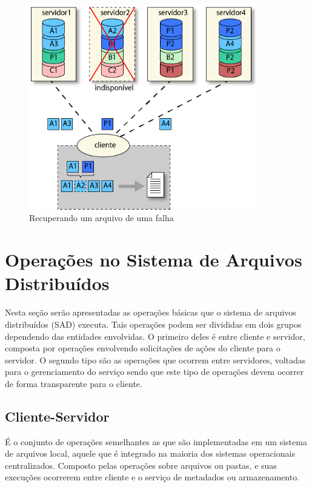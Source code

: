 \begin{figure}[htb]
	\begin{center}
		
		\includegraphics[clip,width=10.0cm]{images/image2.png}
		\caption{Recuperando um arquivo de uma falha}
		\label{fig:img2}
	\end{center}
\end{figure}

\section{Operações no Sistema de Arquivos Distribuídos}

Nesta seção serão apresentadas as operações básicas que o sistema de arquivos distribuídos (SAD) executa. Tais operações podem ser divididas em dois grupos dependendo das entidades envolvidas. O primeiro deles é entre cliente e servidor, composta por operações envolvendo solicitações de ações do cliente para o servidor. O segundo tipo são as operações que ocorrem entre servidores, voltadas para o gerenciamento do serviço sendo que este tipo de operações devem ocorrer de forma transparente para o cliente.
\\

\subsection{Cliente-Servidor}

É o conjunto de operações semelhantes as que são implementadas em um sistema de arquivos local, aquele que é integrado na maioria dos sistemas operacionais centralizados. Composto pelas operações sobre arquivos ou pastas, e suas execuções ocorrerem entre cliente e o serviço de metadados ou armazenamento.
\\

